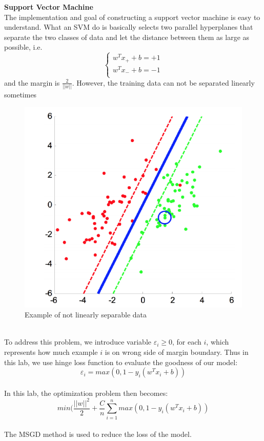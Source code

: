 \documentclass[journal, a4paper]{IEEEtran}
\begin{document}
\centering \textbf{Support Vector Machine} \\
The implementation and goal of constructing a support vector machine is easy to understand. What an SVM do is basically selects two parallel hyperplanes that separate the two classes of data and let the distance between them as large as possible, i.e.
\begin{equation}
\left\{
\begin{aligned}
w^Tx_+ +b  = +1 \\
w^Tx_- +b  = -1 \\
\end{aligned}
\right.
\end{equation}
and the margin is $\frac 2 {||w||}.$
However, the training data can not be separated linearly sometimes
\begin{figure}[!hbt]
		\begin{center}
		\includegraphics[width=\columnwidth]{SVMcase.png}
		\caption{Example of not linearly separable data}
		\label{fig1}
		\end{center}
	\end{figure}\\
To address this problem, we introduce variable $\varepsilon_i \geq 0$, for each $i$, which represents how much example $i$ is on wrong side of margin boundary.
Thus in this lab, we use hinge loss function to evaluate the goodness of our model:
\begin{equation}
\varepsilon_i = max(0,1-y_i(w^Tx_i +b ))
\end{equation} \\
In this lab, the optimization problem then becomes:
\begin{equation}
min (\frac{||w||^2} 2 + \frac C n \sum_{i=1}^n max(0,1-y_i(w^Tx_i +b))
\end{equation} \\
The MSGD method is used to reduce the loss of the model.
\end{document}
